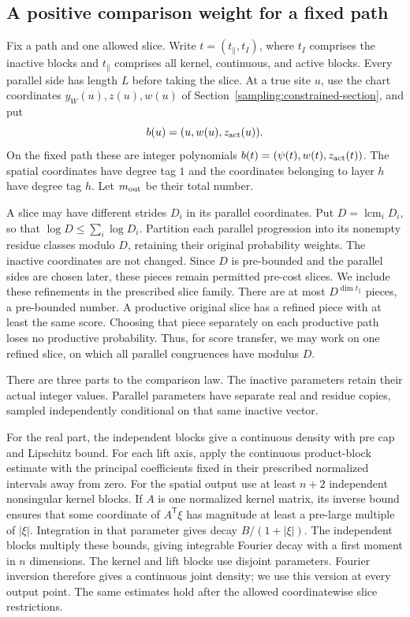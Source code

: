 \subsection{A positive comparison weight for a fixed path}

Fix a path and one allowed slice. Write $t=(t_\parallel,t_I)$,
where $t_I$ comprises the inactive blocks and $t_\parallel$
comprises all kernel, continuous, and active blocks. Every
parallel side has length $L$ before taking the slice. At a true
site $u$, use the chart coordinates $y_W(u),z(u),w(u)$ of
Section~\ref{sampling:constrained-section}, and put
\[
 b(u)=(u,w(u),z_{\rm act}(u)).
\]
On the fixed path these are integer polynomials
$b(t)=(\psi(t),w(t),z_{\rm act}(t))$. The spatial coordinates
have degree tag $1$ and the coordinates belonging to layer $h$
have degree tag $h$. Let $m_{\rm out}$ be their total number.

A slice may have different strides $D_i$ in its parallel coordinates.
Put $D=\operatorname{lcm}_iD_i$, so that
$\log D\le\sum_i\log D_i$. Partition each parallel progression
into its nonempty residue classes modulo $D$, retaining their
original probability weights. The inactive coordinates are not
changed. Since $D$ is pre-bounded and the parallel sides are
chosen later, these pieces remain permitted pre-cost slices.
We include these refinements in the prescribed slice family.
There are at most $D^{\dim t_\parallel}$ pieces, a pre-bounded
number. A productive original slice has a refined piece with at
least the same score. Choosing that piece separately on each
productive path loses no productive probability. Thus, for score
transfer, we may work on one refined slice, on which all parallel
congruences have modulus $D$.

There are three parts to the comparison law. The inactive
parameters retain their actual integer values. Parallel
parameters have separate real and residue copies, sampled
independently conditional on that same inactive vector.

For the real part, the independent blocks give a continuous
density with pre cap and Lipschitz bound. For each lift axis,
apply the continuous product-block estimate with the principal
coefficients fixed in their prescribed normalized intervals
away from zero. For the spatial output use at least $n+2$
independent nonsingular kernel blocks. If $A$ is one normalized
kernel matrix, its inverse bound ensures that some coordinate
of $A^{\mathsf T}\xi$ has magnitude at least a pre-large
multiple of $|\xi|$. Integration in that parameter gives decay
$B/(1+|\xi|)$. The independent blocks multiply these bounds,
giving integrable Fourier decay with a first moment in $n$
dimensions. The kernel and lift blocks use disjoint parameters.
Fourier inversion therefore gives a continuous joint density;
we use this version at every output point. The same estimates
hold after the allowed coordinatewise slice restrictions.

